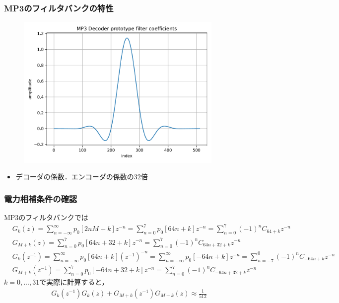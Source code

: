 \documentclass[14pt,xcolor=dvipsnames,table,dvipdfmx]{beamer}
\begin{document}
\begin{frame}[c]
    \frametitle{MP3のフィルタバンクの特性}
    \vspace{-5pt}
    \begin{figure}
        \includegraphics[width=100mm]{./figs/mp3_decoder_prototype_filter_coef.pdf}
    \end{figure}
    \vspace{-5pt}
    \begin{itemize}
        \item デコーダの係数．エンコーダの係数の$32$倍
    \end{itemize}
\end{frame}

\begin{frame}[c]
    \frametitle{電力相補条件の確認}
    MP3のフィルタバンクでは
    \scriptsize
    \begin{align*}
        & G_{k}(z) = \sum_{n = -\infty}^{\infty} p_{0}[2nM + k] z^{-n} = \sum_{n = 0}^{7} p_{0}[64n + k] z^{-n} = \sum_{n = 0}^{7} (-1)^{n} C_{64 + k} z^{-n} \\
        & G_{M+k}(z) = \sum_{n = 0}^{7} p_{0}[64n + 32 + k] z^{-n} = \sum_{n = 0}^{7} (-1)^{n} C_{64n + 32 + k} z^{-n} \\
        & G_{k}(z^{-1}) = \sum_{n = -\infty}^{\infty} p_{0}[64n + k] (z^{-1})^{-n} = \sum_{n = -\infty}^{\infty} p_{0}[-64n + k] z^{-n} = \sum_{n = -7}^{0} (-1)^{n} C_{-64n + k} z^{-n} \\
        & G_{M+k}(z^{-1}) = \sum_{n = 0}^{7} p_{0}[-64n + 32 + k] z^{-n} = \sum_{n = 0}^{7} (-1)^{n} C_{-64n + 32 + k} z^{-n}
    \end{align*}
    \normalsize
    $k = 0, ..., 31$で実際に計算すると，
    \begin{align*}
        G_{k}(z^{-1})G_{k}(z) + G_{M+k}(z^{-1})G_{M+k}(z) \approx \frac{1}{512}
    \end{align*}
\end{frame}
\end{document}
